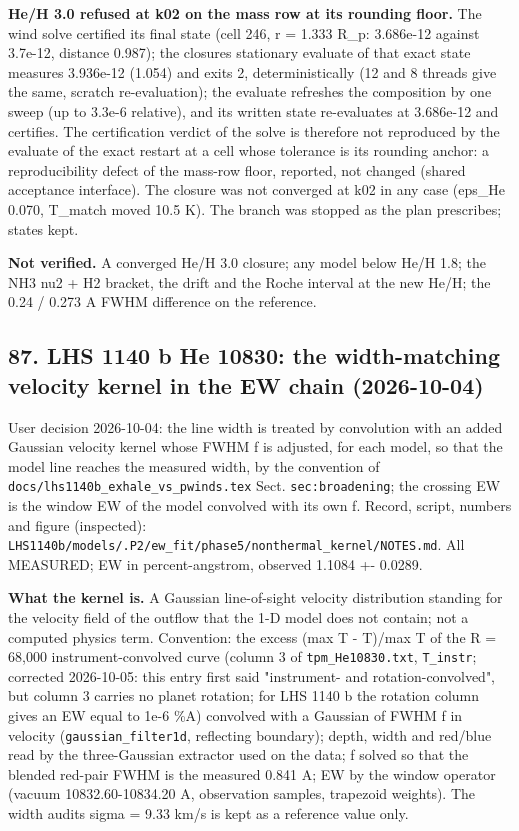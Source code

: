 \documentclass[english,a4paper]{my_memo}
\begin{document}
\textbf{He/H 3.0 refused at k02 on the mass row at its rounding floor.} The wind
solve certified its final state (cell 246, r = 1.333 R\_p: 3.686e-12
against 3.7e-12, distance 0.987); the closure\textquotesingle s stationary evaluate of that
exact state measures 3.936e-12 (1.054) and exits 2, deterministically (12
and 8 threads give the same, scratch re-evaluation); the evaluate refreshes
the composition by one sweep (up to 3.3e-6 relative), and its written state
re-evaluates at 3.686e-12 and certifies. The certification verdict of the
solve is therefore not reproduced by the evaluate of the exact restart at a
cell whose tolerance is its rounding anchor: a reproducibility defect of the
mass-row floor, reported, not changed (shared acceptance interface). The
closure was not converged at k02 in any case (eps\_He 0.070, T\_match moved
10.5 K). The branch was stopped as the plan prescribes; states kept.

\textbf{Not verified.} A converged He/H 3.0 closure; any model below He/H 1.8;
the NH3 nu2 + H2 bracket, the drift and the Roche interval at the new He/H;
the 0.24 / 0.273 A FWHM difference on the reference.

\subsection{87. LHS 1140 b He 10830: the width-matching velocity kernel in the EW chain (2026-10-04)}\label{87-lhs-1140-b-he-10830-the-width-matching-velocity-kernel-in-the-ew-chain-2026-10-04}

User decision 2026-10-04: the line width is treated by convolution with an
added Gaussian velocity kernel whose FWHM f is adjusted, for each model, so
that the model line reaches the measured width, by the convention of
\texttt{docs/lhs1140b\_exhale\_vs\_pwinds.tex} Sect. \texttt{sec:broadening}; the crossing EW
is the window EW of the model convolved with its own f. Record, script,
numbers and figure (inspected):
\texttt{LHS1140b/models/.P2/ew\_fit/phase5/nonthermal\_kernel/NOTES.md}. All
MEASURED; EW in percent-angstrom, observed 1.1084 +- 0.0289.

\textbf{What the kernel is.} A Gaussian line-of-sight velocity distribution
standing for the velocity field of the outflow that the 1-D model does not
contain; not a computed physics term. Convention: the excess (max T - T)/max T
of the R = 68,000 instrument-convolved curve (column 3 of
\texttt{tpm\_He10830.txt}, \texttt{T\_instr}; corrected 2026-10-05: this entry first said
"instrument- and rotation-convolved", but column 3 carries no planet
rotation; for LHS 1140 b the rotation column gives an EW equal to 1e-6 \%A) convolved with a Gaussian of FWHM f in velocity
(\texttt{gaussian\_filter1d}, reflecting boundary); depth, width and red/blue read by
the three-Gaussian extractor used on the data; f solved so that the blended
red-pair FWHM is the measured 0.841 A; EW by the window operator (vacuum
10832.60-10834.20 A, observation samples, trapezoid weights). The width
audit\textquotesingle s sigma = 9.33 km/s is kept as a reference value only.
\end{document}
